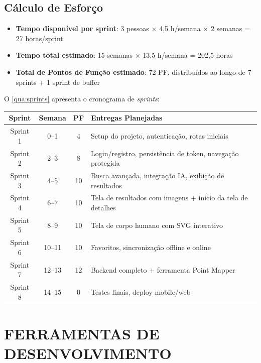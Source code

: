 \subsection{Cálculo de Esforço}

\begin{itemize}
    \item \textbf{Tempo disponível por sprint}: 3 pessoas $\times$ 4,5 h/semana $\times$ 2 semanas = 27 horas/sprint
    \item \textbf{Tempo total estimado}: 15 semanas $\times$ 13,5 h/semana = 202,5 horas
    \item \textbf{Total de Pontos de Função estimado}: 72 PF, distribuídos ao longo de 7 sprints + 1 sprint de buffer
\end{itemize}

O \autoref{qua:sprints} apresenta o cronograma de \textit{sprints}:

\begin{quadro}[htb]
\caption{Cronograma de Sprints}
\label{qua:sprints}
\centering
\footnotesize
\begin{tabular}{|c|c|c|p{7cm}|}
\hline
\textbf{Sprint} & \textbf{Semana} & \textbf{PF} & \textbf{Entregas Planejadas} \\
\hline
Sprint 1 & 0--1 & 4 & Setup do projeto, autenticação, rotas iniciais \\
\hline
Sprint 2 & 2--3 & 8 & Login/registro, persistência de token, navegação protegida \\
\hline
Sprint 3 & 4--5 & 10 & Busca avançada, integração IA, exibição de resultados \\
\hline
Sprint 4 & 6--7 & 10 & Tela de resultados com imagens + início da tela de detalhes \\
\hline
Sprint 5 & 8--9 & 10 & Tela de corpo humano com SVG interativo \\
\hline
Sprint 6 & 10--11 & 10 & Favoritos, sincronização offline e online \\
\hline
Sprint 7 & 12--13 & 12 & Backend completo + ferramenta Point Mapper \\
\hline
Sprint 8 & 14--15 & 0 & Testes finais, deploy mobile/web \\
\hline
\end{tabular}
\end{quadro}

\section{FERRAMENTAS DE DESENVOLVIMENTO} \label{sec:ferramentas}

